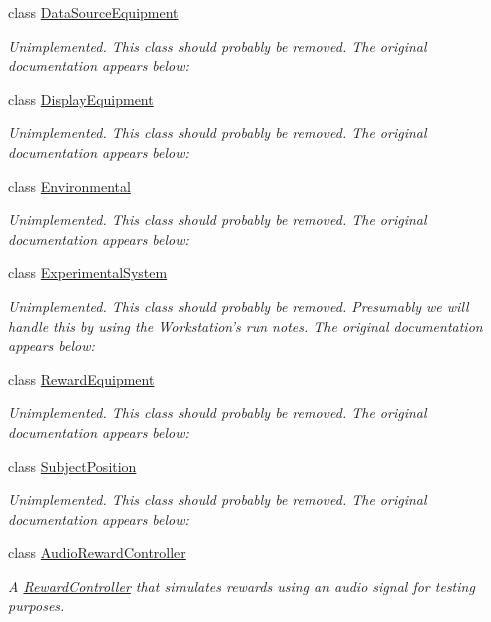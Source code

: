 \begin{DoxyCompactItemize}
class \hyperlink{class_picto_1_1_data_source_equipment}{Data\-Source\-Equipment}
\begin{DoxyCompactList}\small\item\em Unimplemented. This class should probably be removed. The original documentation appears below\-: \end{DoxyCompactList}\item 
class \hyperlink{class_picto_1_1_display_equipment}{Display\-Equipment}
\begin{DoxyCompactList}\small\item\em Unimplemented. This class should probably be removed. The original documentation appears below\-: \end{DoxyCompactList}\item 
class \hyperlink{class_picto_1_1_environmental}{Environmental}
\begin{DoxyCompactList}\small\item\em Unimplemented. This class should probably be removed. The original documentation appears below\-: \end{DoxyCompactList}\item 
class \hyperlink{class_picto_1_1_experimental_system}{Experimental\-System}
\begin{DoxyCompactList}\small\item\em Unimplemented. This class should probably be removed. Presumably we will handle this by using the Workstation's run notes. The original documentation appears below\-: \end{DoxyCompactList}\item 
class \hyperlink{class_picto_1_1_reward_equipment}{Reward\-Equipment}
\begin{DoxyCompactList}\small\item\em Unimplemented. This class should probably be removed. The original documentation appears below\-: \end{DoxyCompactList}\item 
class \hyperlink{class_picto_1_1_subject_position}{Subject\-Position}
\begin{DoxyCompactList}\small\item\em Unimplemented. This class should probably be removed. The original documentation appears below\-: \end{DoxyCompactList}\item 
class \hyperlink{class_picto_1_1_audio_reward_controller}{Audio\-Reward\-Controller}
\begin{DoxyCompactList}\small\item\em A \hyperlink{class_picto_1_1_reward_controller}{Reward\-Controller} that simulates rewards using an audio signal for testing purposes. \end{DoxyCompactList}\item 

\end{DoxyCompactItemize}
